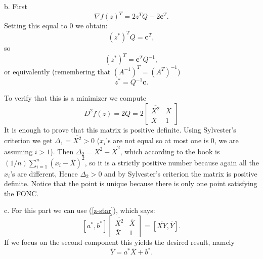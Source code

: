 \documentclass{article}
\newcommand{\bld}[1]{\boldsymbol{#1}}
\begin{document}
b. First
\[
	\nabla f(z)^T=2z^TQ-2\bld{c}^T.
\]
Setting this equal to 0 we obtain:
\begin{equation}\label{z-star}
	(z^*)^TQ=\bld{c}^T,
\end{equation}
so
\[
	(z^*)^T=\bld{c}^TQ^{-1},
\]
or equivalently (remembering that $(A^{-1})^T=(A^T)^{-1}$)
\[
z^*=Q^{-1}\bld{c}.
\]

To verify that this is a minimizer we compute
\[
	D^2f(z)=2Q
	=
	2\begin{bmatrix}
		\overline{X^2} & \overline{X}\\
		\overline{X} & 1
	\end{bmatrix}
\]
It is enough to prove that this matrix is positive definite.
Using Sylvester's criterion we get $\Delta_1=\overline{X^2}>0$ ($x_i$'s are not
equal so at most one is 0, we are assuming $i>1$). Then
$\Delta_2=\overline{X^2}-\overline{X}^2$, which according to the book is
$(1/n)\sum_{i=1}^n(x_i-\overline{X})^2$, so it is a strictly positive number
because again all the $x_i$'s are different, Hence $\Delta_2>0$ and by
Sylvester's criterion the matrix is positive definite. Notice that the point is
unique because there is only one point satisfying the FONC.

c. For this part we can use (\ref{z-star}), which says:
\[
[a^*,b^*]
\begin{bmatrix}
	\overline{X^2} & \overline{X}\\
	\overline{X} & 1
\end{bmatrix}
=
[\overline{XY},\overline{Y}].
\]
If we focus on the second component this yields the desired result, namely
\[
	\overline{Y}=a^*\overline{X}+b^*.
\]
\end{document}
